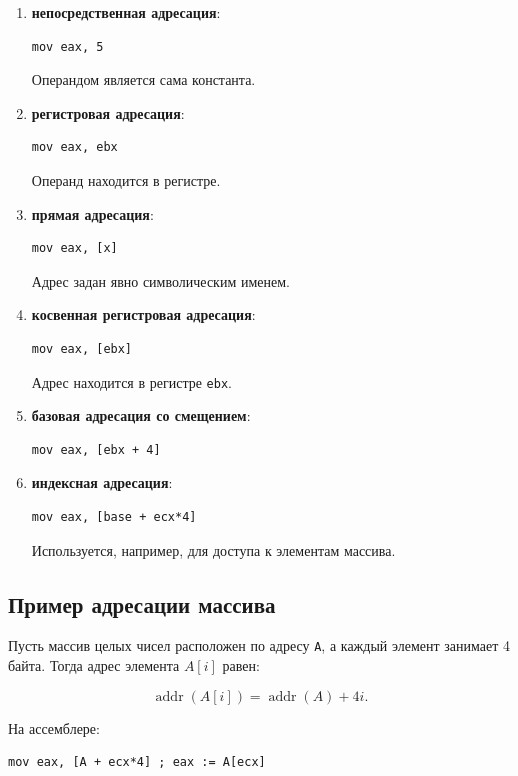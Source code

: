 \documentclass[12pt,a4paper]{article}
\begin{document}
\begin{enumerate}
    \item \textbf{непосредственная адресация}:
\begin{lstlisting}
mov eax, 5
\end{lstlisting}
Операндом является сама константа.

    \item \textbf{регистровая адресация}:
\begin{lstlisting}
mov eax, ebx
\end{lstlisting}
Операнд находится в регистре.

    \item \textbf{прямая адресация}:
\begin{lstlisting}
mov eax, [x]
\end{lstlisting}
Адрес задан явно символическим именем.

    \item \textbf{косвенная регистровая адресация}:
\begin{lstlisting}
mov eax, [ebx]
\end{lstlisting}
Адрес находится в регистре \texttt{ebx}.

    \item \textbf{базовая адресация со смещением}:
\begin{lstlisting}
mov eax, [ebx + 4]
\end{lstlisting}

    \item \textbf{индексная адресация}:
\begin{lstlisting}
mov eax, [base + ecx*4]
\end{lstlisting}
Используется, например, для доступа к элементам массива.
\end{enumerate}

\subsection{Пример адресации массива}

Пусть массив целых чисел расположен по адресу \texttt{A}, а каждый элемент занимает 4 байта. Тогда адрес элемента $A[i]$ равен:

\[
\operatorname{addr}(A[i]) = \operatorname{addr}(A) + 4i.
\]

На ассемблере:

\begin{lstlisting}
mov eax, [A + ecx*4] ; eax := A[ecx]
\end{lstlisting}
\end{document}
